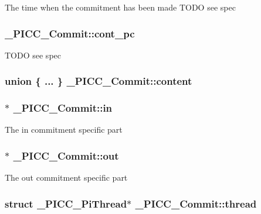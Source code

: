The time when the commitment has been made T\-O\-D\-O see spec \hypertarget{struct__PICC__Commit_ad0a2d3efd431b0f5a76713654b08f140}{
\subsubsection[{cont\-\_\-pc}]{ \-\_\-\-P\-I\-C\-C\-\_\-\-Commit\-::cont\-\_\-pc}}\label{struct__PICC__Commit_ad0a2d3efd431b0f5a76713654b08f140}
T\-O\-D\-O see spec \hypertarget{struct__PICC__Commit_a64f32e0f5452a5abf31a90440b13be6e}{
\subsubsection[{content}]{\setlength{\rightskip}{0pt plus 5cm}union \{ ... \}   \-\_\-\-P\-I\-C\-C\-\_\-\-Commit\-::content}}\label{struct__PICC__Commit_a64f32e0f5452a5abf31a90440b13be6e}
\hypertarget{struct__PICC__Commit_a745a1a078043d4467bfa29ebf5d08a5b}{
\subsubsection[{in}]{$\ast$ \-\_\-\-P\-I\-C\-C\-\_\-\-Commit\-::in}}\label{struct__PICC__Commit_a745a1a078043d4467bfa29ebf5d08a5b}
The in commitment specific part \hypertarget{struct__PICC__Commit_a7ec6ea1ae1ab4b2b46da706874b4adda}{
\subsubsection[{out}]{$\ast$ \-\_\-\-P\-I\-C\-C\-\_\-\-Commit\-::out}}\label{struct__PICC__Commit_a7ec6ea1ae1ab4b2b46da706874b4adda}
The out commitment specific part \hypertarget{struct__PICC__Commit_a32fcb5ed4aa9281f5d9e6e64e6d65e36}{
\subsubsection[{thread}]{\setlength{\rightskip}{0pt plus 5cm}struct {\bf \-\_\-\-P\-I\-C\-C\-\_\-\-Pi\-Thread}$\ast$ \-\_\-\-P\-I\-C\-C\-\_\-\-Commit\-::thread}}\label{struct__PICC__Commit_a32fcb5ed4aa9281f5d9e6e64e6d65e36}
